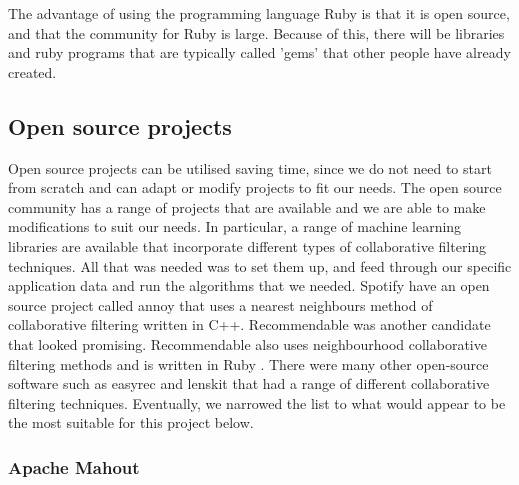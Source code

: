 The advantage of using the programming language Ruby is that it is open source, and that the community for Ruby is large. Because of this, there will be libraries and ruby programs that are typically called 'gems' that other people have already created. 

\subsection{Open source projects}

Open source projects can be utilised saving time, since we do not need to start from scratch and can adapt or modify projects to fit our needs. The open source community has a range of projects that are available and we are able to make modifications to suit our needs. In particular, a range of machine learning libraries are available that incorporate different types of collaborative filtering techniques. All that was needed was to set them up, and feed through our specific application data and run the algorithms that we needed. Spotify have an open source project called annoy \cite{annoy} that uses a nearest neighbours method of collaborative filtering written in C++. Recommendable was another candidate that looked promising. Recommendable also uses neighbourhood collaborative filtering methods and is written in Ruby \cite{recommendable}. There were many other open-source software such as easyrec \cite{easyrec} and lenskit \cite{lenskit} that had a range of different collaborative filtering techniques. Eventually, we narrowed the list to what would appear to be the most suitable for this project below. 
\subsubsection{Apache Mahout}

